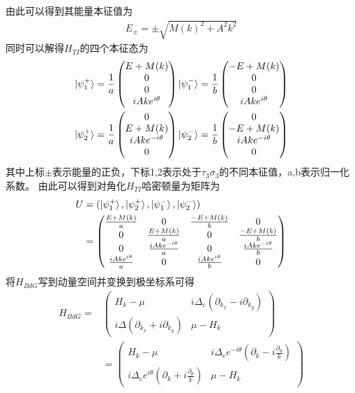\documentclass[22pt]{article}
\begin{document}
由此可以得到其能量本征值为
\begin{align}
	E_{\pm}=\pm\sqrt{M(k)^2+A^2k^2}
\end{align}
同时可以解得$H_{TI}$的四个本征态为
\begin{align}
	\ket{\psi_1^{+}}=
	\frac{1}{a}
	\begin{pmatrix}
		E+M(k) \\
		0\\
		0\\
		iAke^{i\theta}
	\end{pmatrix}
	\ket{\psi_1^{-}}=
	\frac{1}{b}
	\begin{pmatrix}
		-E+M(k)\\
		0\\
		0\\
		iAke^{i\theta}
	\end{pmatrix}
	\\
	\ket{\psi_2^{+}}=
	\frac{1}{a}
	\begin{pmatrix}
		0\\
		E+M(k)\\
		iAke^{-i\theta}\\
		0
	\end{pmatrix}
	\ket{\psi_2^{-}}=
	\frac{1}{b}
	\begin{pmatrix}
		0\\
		-E+M(k)\\
		iAke^{-i\theta}\\
		0
	\end{pmatrix}
\end{align}
其中上标$\pm$表示能量的正负，下标1,2表示处于$\tau_3\sigma_3$的不同本征值，a,b表示归一化系数。
由此可以得到对角化$H_{TI}$哈密顿量为矩阵为
\begin{align}
	U&=(\ket{\psi_1^+},\ket{\psi_2^+},\ket{\psi_1^-},\ket{\psi_2^-})\\
	   &=\begin{pmatrix}
	   	\frac{E+M(k)}{a} &  0 &  \frac{-E+M(k)}{b} &0 \\
	   	0   & \frac{E+M(k)}{a} &0 &\frac{-E+M(k)}{b}
	   	\\
	   	0   &\frac{iAke^{-i\theta}}{a}&0 &\frac{iAke^{-i\theta}}{b}
	   	\\
	   	\frac{iAke^{i\theta}}{a} &0& \frac{iAke^{i\theta}}{b}  &0
	   \end{pmatrix}
\end{align}
将$H_{BdG}$写到动量空间并变换到极坐标系可得
\begin{align}
	H_{BdG}=&
	\begin{pmatrix}
		 H_k-\mu    &   i\Delta_e(\partial_{k_x}-i\partial_{k_y})\\
		 i\Delta(\partial_{k_x}+i\partial_{k_y})  & \mu-H_k
	\end{pmatrix} \\
&=\begin{pmatrix}
					H_k-\mu    &   i\Delta_ee^{-i\theta}(\partial_k-i\frac{\partial_{\theta}}{k}) \\
					i\Delta_ee^{i\theta}(\partial_k+i\frac{\partial_{\theta}}{k})&\mu-H_k
		\end{pmatrix}
\end{align}
\end{document}

